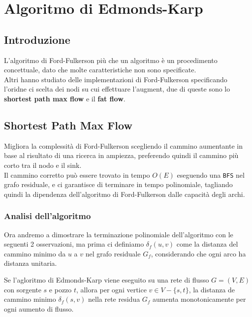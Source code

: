 \chapter{Algoritmo di Edmonds-Karp}
\section{Introduzione}
L'algoritmo di Ford-Fulkerson più che un algoritmo è un procedimento
concettuale, dato che molte caratteristiche non sono specificate.\\

Altri hanno studiato delle implementazioni di Ford-Fulkerson specificando
l'oridne ci scelta dei nodi su cui effettuare l'augment, due di queste sono lo
\textbf{shortest path max flow} e il \textbf{fat flow}.


\section{Shortest Path Max Flow}
Migliora la complessità di Ford-Fulkerson scegliendo il cammino aumentante in
base al risultato di una ricerca in ampiezza, preferendo quindi il cammino più
corto tra il nodo e il sink.\\

Il cammino corretto può essere trovato in tempo $O(E)$ eseguendo una
\texttt{BFS} nel grafo residuale, e ci garantisce di terminare in tempo
polinomiale, tagliando quindi la dipendenza dell'algoritmo di Ford-Fulkerson
dalle capacità degli archi.

\subsection{Analisi dell'algoritmo}
Ora andremo a dimostrare la terminazione polinomiale dell'algoritmo con le
seguenti 2 osservazioni, ma prima ci definiamo $\delta_f(u,v)$ come la distanza
del cammino minimo da $u$ a $v$ nel grafo residuale $G_f$, considerando che ogni
arco ha distanza unitaria.

\begin{myblockquote}
    \begin{minipage}{\textwidth}
        \begin{theorem}
            Se l'agloritmo di Edmonds-Karp viene eseguito su una rete di flusso
            $G = (V, E)$ con sorgente $s$ e pozzo $t$, allora per ogni
            vertice $v \in V - \{s,t\}$, la distanza de cammino minimo
            $\delta_f(s,v)$ nella rete residua $G_f$ aumenta \linebreak
            monotonicamente per ogni aumento di flusso.
        \end{theorem}
    \end{minipage}
\end{myblockquote}

